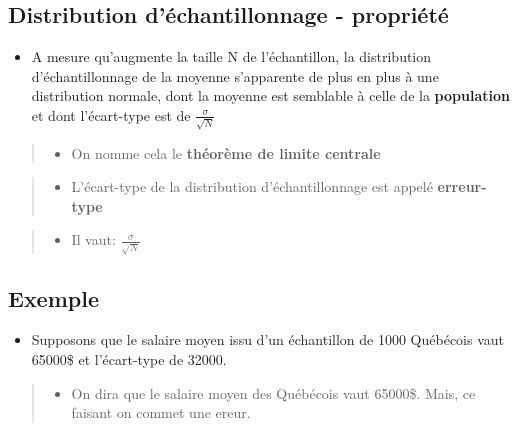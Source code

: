 \documentclass[
]{article}
\providecommand{\tightlist}{%
  \setlength{\itemsep}{0pt}\setlength{\parskip}{0pt}}
\begin{document}
\hypertarget{distribution-duxe9chantillonnage---propriuxe9tuxe9}{%
\subsection{Distribution d'échantillonnage -
propriété}\label{distribution-duxe9chantillonnage---propriuxe9tuxe9}}

\begin{itemize}
\tightlist
\item
  A mesure qu'augmente la taille N de l'échantillon, la distribution
  d'échantillonnage de la moyenne s'apparente de plus en plus à une
  distribution normale, dont la moyenne est semblable à celle de la
  \textbf{population} et dont l'écart-type est de
  \(\frac{\sigma}{\sqrt{N}}\)
\end{itemize}

\begin{quote}
\begin{itemize}
\tightlist
\item
  On nomme cela le \textbf{théorème de limite centrale}
\end{itemize}
\end{quote}

\begin{quote}
\begin{itemize}
\tightlist
\item
  L'écart-type de la distribution d'échantillonnage est appelé
  \textbf{erreur-type}
\end{itemize}
\end{quote}

\begin{quote}
\begin{itemize}
\tightlist
\item
  Il vaut: \(\frac{\sigma}{\sqrt{N}}\)
\end{itemize}
\end{quote}

\hypertarget{exemple}{%
\subsection{Exemple}\label{exemple}}

\begin{itemize}
\tightlist
\item
  Supposons que le salaire moyen issu d'un échantillon de 1000 Québécois
  vaut 65000\$ et l'écart-type de 32000.
\end{itemize}

\begin{quote}
\begin{itemize}
\tightlist
\item
  On dira que le salaire moyen des Québécois vaut 65000\$. Mais, ce
  faisant on commet une ereur.
\end{itemize}
\end{quote}
\end{document}

